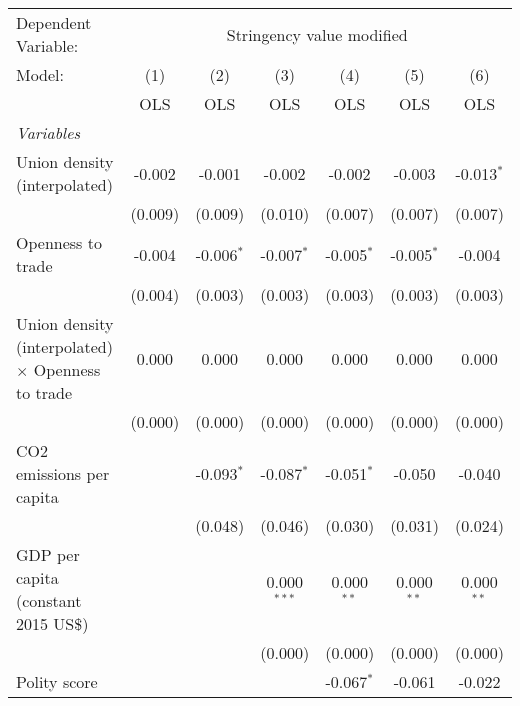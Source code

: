 
\begingroup
\centering
\begin{tabular}{lcccccc}
   \toprule
   Dependent Variable: & \multicolumn{6}{c}{Stringency value modified}\\
   Model:                                                   & (1)     & (2)          & (3)           & (4)          & (5)          & (6)\\  
                                                            &  OLS    & OLS          & OLS           & OLS          & OLS          & OLS\\  
   \midrule
   \emph{Variables}\\
   Union density (interpolated)                             & -0.002  & -0.001       & -0.002        & -0.002       & -0.003       & -0.013$^{*}$\\   
                                                            & (0.009) & (0.009)      & (0.010)       & (0.007)      & (0.007)      & (0.007)\\   
   Openness to trade                                        & -0.004  & -0.006$^{*}$ & -0.007$^{*}$  & -0.005$^{*}$ & -0.005$^{*}$ & -0.004\\   
                                                            & (0.004) & (0.003)      & (0.003)       & (0.003)      & (0.003)      & (0.003)\\   
   Union density (interpolated) $\times$ Openness to trade  & 0.000   & 0.000        & 0.000         & 0.000        & 0.000        & 0.000\\   
                                                            & (0.000) & (0.000)      & (0.000)       & (0.000)      & (0.000)      & (0.000)\\   
   CO2 emissions per capita                                 &         & -0.093$^{*}$ & -0.087$^{*}$  & -0.051$^{*}$ & -0.050       & -0.040\\   
                                                            &         & (0.048)      & (0.046)       & (0.030)      & (0.031)      & (0.024)\\   
   GDP per capita (constant 2015 US\$)                      &         &              & 0.000$^{***}$ & 0.000$^{**}$ & 0.000$^{**}$ & 0.000$^{**}$\\   
                                                            &         &              & (0.000)       & (0.000)      & (0.000)      & (0.000)\\   
   Polity score                                             &         &              &               & -0.067$^{*}$ & -0.061       & -0.022\\   

\end{tabular}
